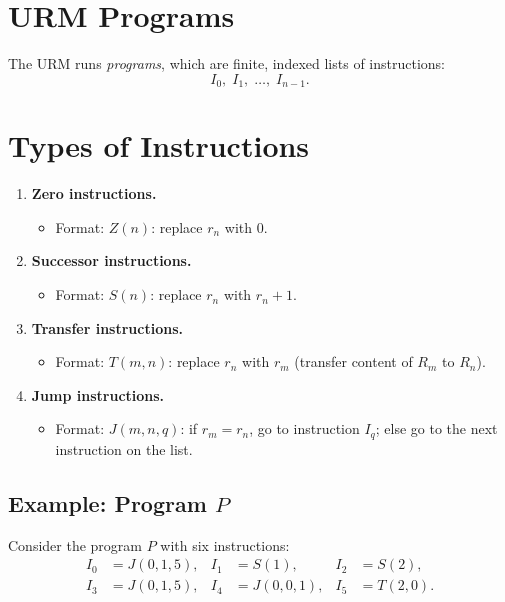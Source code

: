 \documentclass[11pt]{article}
\begin{document}
\section{URM Programs}

The URM runs \emph{programs}, which are finite, indexed lists of instructions:
\[
    I_0,\; I_1,\; \dots,\; I_{n-1}.
\]

\section{Types of Instructions}

\begin{enumerate}[leftmargin=1.8em, label=\arabic*)]
    \item \textbf{Zero instructions.}
    \begin{itemize}[leftmargin=1.2em]
        \item Format: $Z(n)$: replace $r_n$ with $0$.
    \end{itemize}

    \item \textbf{Successor instructions.}
    \begin{itemize}[leftmargin=1.2em]
        \item Format: $S(n)$: replace $r_n$ with $r_n + 1$.
    \end{itemize}

    \item \textbf{Transfer instructions.}
    \begin{itemize}[leftmargin=1.2em]
        \item Format: $T(m,n)$: replace $r_n$ with $r_m$ (transfer content of $R_m$ to $R_n$).
    \end{itemize}

    \item \textbf{Jump instructions.}
    \begin{itemize}[leftmargin=1.2em]
        \item Format: $J(m, n, q)$: if $r_m = r_n$, go to instruction $I_q$; else go to the next instruction on the list.
    \end{itemize}
\end{enumerate}

\subsection{Example: Program $P$}

Consider the program $P$ with six instructions:
\begin{align*}
    I_0 &= J(0, 1, 5), & I_1 &= S(1), & I_2 &= S(2), \\
    I_3 &= J(0, 1, 5), & I_4 &= J(0, 0, 1), & I_5 &= T(2, 0).
\end{align*}
\end{document}
